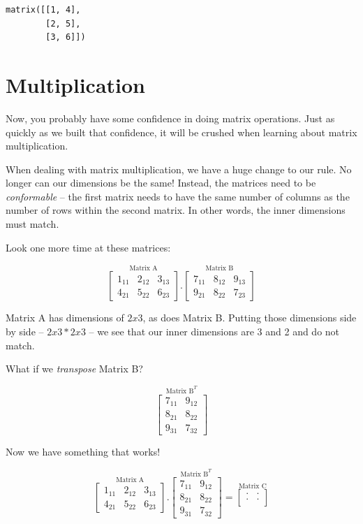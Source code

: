 \documentclass[
  letterpaper,
]{krantz}
\begin{document}
\begin{verbatim}
matrix([[1, 4],
        [2, 5],
        [3, 6]])
\end{verbatim}

\section{Multiplication}\label{multiplication}

Now, you probably have some confidence in doing matrix operations. Just
as quickly as we built that confidence, it will be crushed when learning
about matrix multiplication.

When dealing with matrix multiplication, we have a huge change to our
rule. No longer can our dimensions be the same! Instead, the matrices
need to be \emph{conformable} -- the first matrix needs to have the same
number of columns as the number of rows within the second matrix. In
other words, the inner dimensions must match.

Look one more time at these matrices:

\[
\stackrel{\mbox{Matrix A}}{
\begin{bmatrix}
1_{11} & 2_{12} & 3_{13}\\
4_{21} & 5_{22} & 6_{23}
\end{bmatrix}
}
.
\stackrel{\mbox{Matrix B}}{
\begin{bmatrix}
7_{11} & 8_{12} & 9_{13}\\
9_{21} & 8_{22} & 7_{23}
\end{bmatrix} 
}
\]

Matrix A has dimensions of \(2x3\), as does Matrix B. Putting those
dimensions side by side -- \(2x3 * 2x3\) -- we see that our inner
dimensions are 3 and 2 and do not match.

What if we \emph{transpose} Matrix B?

\[
\stackrel{\mbox{Matrix B}^T}{
\begin{bmatrix}
7_{11} & 9_{12} \\ 
8_{21}& 8_{22}\\
9_{31} & 7_{32}
\end{bmatrix} 
}
\]

Now we have something that works!

\[
\stackrel{\mbox{Matrix A}}{
\begin{bmatrix}
1_{11} & 2_{12} & 3_{13}\\
4_{21} & 5_{22} & 6_{23}
\end{bmatrix}
}
.
\stackrel{\mbox{Matrix B}^T}{
\begin{bmatrix}
7_{11} & 9_{12} \\ 
8_{21}& 8_{22}\\
9_{31} & 7_{32}
\end{bmatrix} 
}
=
\stackrel{\mbox{Matrix C}}{
\begin{bmatrix}
. & . \\
. & . \\
\end{bmatrix}
}
\]
\end{document}
